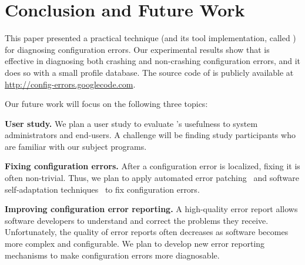 \section{Conclusion and Future Work}
\vspace{-1mm}

This paper presented a practical technique (and
its tool implementation, called \ourtool) for diagnosing
configuration errors.
Our experimental results show that \ourtool is effective in
diagnosing both crashing and non-crashing configuration errors,
and it does so with a small profile database.
The source code of \ourtool is publicly available at
\url{http://config-errors.googlecode.com}.

\vspace{1mm}

Our future
work will focus on the following three topics:

\textbf{User study.} We plan a user study to evaluate
\ourtool's usefulness to system administrators and
end-users. A challenge will be finding study participants
who are familiar with our subject programs.

\textbf{Fixing configuration errors.} After a configuration error
is localized, fixing it is
often non-trivial. Thus, we
plan to apply automated error patching~\cite{rangefix} and
software self-adaptation techniques~\cite{Wang:2009:STR} to
fix configuration errors.


\textbf{Improving configuration error reporting.} A high-quality
error report allows software developers to understand and correct the problems
they receive. 
Unfortunately, the quality of error reports often
decreases as software becomes more complex and configurable.
We plan to develop new error reporting mechanisms
to make configuration errors
more diagnosable.

